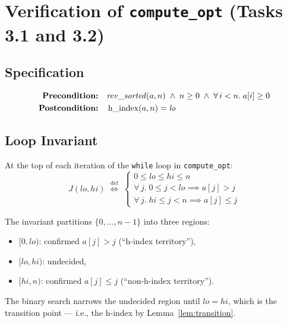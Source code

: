 \section{Verification of \texttt{compute\_opt} (Tasks 3.1 and 3.2)}
\label{sec:compute_opt}

\subsection{Specification}

\begin{align*}
  \textbf{Precondition:}\quad & \mathit{rev\_sorted}(a, n) \;\wedge\; n \geq 0
    \;\wedge\; \forall\, i < n.\; a[i] \geq 0 \\
  \textbf{Postcondition:}\quad & \operatorname{h\_index}(a, n) = \mathit{lo}
\end{align*}

\subsection{Loop Invariant}

\begin{invariant}\label{inv:compute-opt}
At the top of each iteration of the \texttt{while} loop in \texttt{compute\_opt}:
\[
  J(\mathit{lo}, \mathit{hi}) \;\stackrel{\text{def}}{\iff}\;
  \begin{cases}
    0 \leq \mathit{lo} \leq \mathit{hi} \leq n \\
    \forall\, j.\; 0 \leq j < \mathit{lo} \implies a[j] > j \\
    \forall\, j.\; \mathit{hi} \leq j < n \implies a[j] \leq j
  \end{cases}
\]
\end{invariant}

\begin{remark}
The invariant partitions $\{0, \ldots, n{-}1\}$ into three regions:
\begin{itemize}
  \item $[0, \mathit{lo})$: confirmed $a[j] > j$ (``h-index territory''),
  \item $[\mathit{lo}, \mathit{hi})$: undecided,
  \item $[\mathit{hi}, n)$: confirmed $a[j] \leq j$ (``non-h-index territory'').
\end{itemize}
The binary search narrows the undecided region until $\mathit{lo} = \mathit{hi}$,
which is the transition point --- i.e., the h-index by Lemma~\ref{lem:transition}.
\end{remark}

